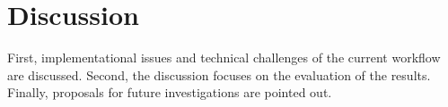 \documentclass[10pt,a4paper,twocolumn]{scrartcl}
\begin{document}
%
%
%
%
%
%
%
%
%

\section{Discussion}
First, implementational issues and technical challenges of the current workflow are discussed. Second, the discussion focuses on the evaluation of the results. Finally, proposals for future investigations are pointed out.
\end{document}
